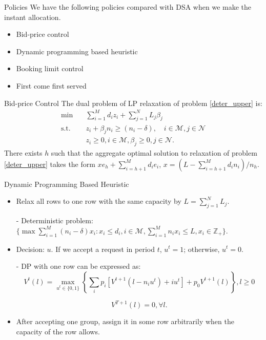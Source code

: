     \begin{frame}{Policies}
      We have the following policies compared with DSA when we make the instant allocation.
    
      \begin{itemize}
        \item Bid-price control
        \item Dynamic programming based heuristic
        \item Booking limit control
        \item First come first served
      \end{itemize}
    \end{frame}

      \begin{frame}{Bid-price Control}
        The dual problem of LP relaxation of problem \eqref{deter_upper} is:
        \begin{equation}\label{bid-price_dual}
          \begin{aligned}
          \min \quad & \sum_{i=1}^{M} d_i z_i + \sum_{j= 1}^{N} L_j \beta_{j} \\
          \text {s.t.} \quad & z_{i} + \beta_j n_i \geq (n_i-\delta), \quad i \in \mathcal{M}, j \in \mathcal{N} \\
          & z_{i} \geq 0, i \in \mathcal{M}, \beta_{j} \geq 0, j \in \mathcal{N}.
          \end{aligned}
        \end{equation}
        \small There exists $h$ such that the aggregate optimal solution to relaxation of problem \eqref{deter_upper} takes the form $x e_{h} + \sum_{i=h+1} ^{M} d_{i} e_{i}$, $x = (L- \sum_{i = h+1}^{M} {d_i n_i})/ n_h$.

      \end{frame}

      \begin{frame}{Dynamic Programming Based Heuristic}
        \begin{itemize}
        \item Relax all rows to one row with the same capacity by $L = \sum_{j=1}^{N} L_j$.
        \item[-] Deterministic problem: $\{\max \sum_{i=1}^{M} (n_i- \delta) x_{i}: x_{i} \leq d_{i}, i \in \mathcal{M}, \sum_{i=1}^{M} n_{i} x_{i} \leq L, x_{i} \in \mathbb{Z}_{+}\}$.
        \item Decision: $u$. If we accept a request in period $t$, $u^t = 1$; otherwise, $u^t =0$.  
        \item[-] DP with one row can be expressed as:
        $$V^{t}(l) =  \max_{u^{t} \in \{0,1\}} \left\{ \sum_{i} p_i [V^{t+1}(l-n_i u^{t})+ i u^{t}] + p_0 V^{t+1}(l)\right\}, l \geq 0 $$

        $$V^{T+1}(l) =0, \forall l.$$
        \item After accepting one group, assign it in some row arbitrarily when the capacity of the row allows.
        \end{itemize}
      \end{frame}
      
